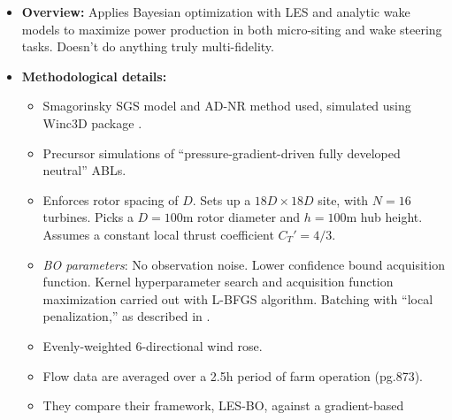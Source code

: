 \documentclass[12pt]{article}
\begin{document}
\begin{itemize}
    \item \textbf{Overview:} Applies Bayesian optimization with LES and
        analytic wake models to maximize power production in both micro-siting
        and wake steering tasks. Doesn't do anything truly multi-fidelity.
    \item \textbf{Methodological details:} 
    \begin{itemize}
        \item Smagorinsky SGS model and AD-NR method used, simulated using
            Winc3D package \cite{deskosWInc3DNovelFramework2020}.
        \item Precursor simulations of ``pressure-gradient-driven fully
            developed neutral'' ABLs.
        \item Enforces rotor spacing of $D$. Sets up a $18D \times 18D$ site,
            with $N = 16$ turbines. Picks a $D = 100$m rotor diameter and $h =
            100$m hub height. Assumes a constant local thrust coefficient $C_T'
            = 4 / 3$.
        \item \emph{BO parameters}: No observation noise. Lower confidence
            bound acquisition function. Kernel hyperparameter search and
            acquisition function maximization carried out with L-BFGS
            algorithm. Batching with ``local penalization,'' as described in
            \cite{gonzalezBatchBayesianOptimization2016}.
        \item Evenly-weighted 6-directional wind rose.
        \item Flow data are averaged over a 2.5h period of farm operation (pg.873).
        \item They compare their framework, LES-BO, against a gradient-based

\end{itemize}
\end{itemize}
\end{document}
